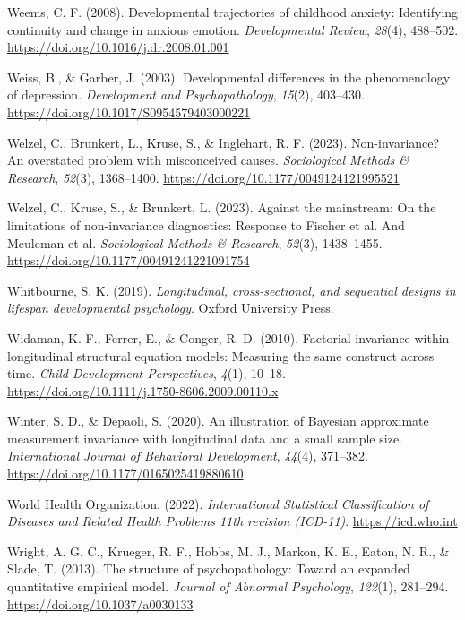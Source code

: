 \documentclass[
  american,
  letterpaper,
  12pt]{article}
\newlength{\cslhangindent}
\newenvironment{CSLReferences}[2] %
 {\begin{list}{}{%
  \setlength{\itemindent}{0pt}
  \setlength{\leftmargin}{0pt}
  \setlength{\parsep}{0pt}
  \ifodd #1
   \setlength{\leftmargin}{\cslhangindent}
   \setlength{\itemindent}{-1\cslhangindent}
  \fi
  \setlength{\itemsep}{#2\baselineskip}}}
 {\end{list}}
\begin{document}
\begin{CSLReferences}{1}{0}
Weems, C. F. (2008). Developmental trajectories of childhood anxiety:
Identifying continuity and change in anxious emotion.
\emph{Developmental Review}, \emph{28}(4), 488--502.
\url{https://doi.org/10.1016/j.dr.2008.01.001}

Weiss, B., \& Garber, J. (2003). Developmental differences in the
phenomenology of depression. \emph{Development and Psychopathology},
\emph{15}(2), 403--430. \url{https://doi.org/10.1017/S0954579403000221}

Welzel, C., Brunkert, L., Kruse, S., \& Inglehart, R. F. (2023).
Non-invariance? {An} overstated problem with misconceived causes.
\emph{Sociological Methods \& Research}, \emph{52}(3), 1368--1400.
\url{https://doi.org/10.1177/0049124121995521}

Welzel, C., Kruse, S., \& Brunkert, L. (2023). Against the mainstream:
{On} the limitations of non-invariance diagnostics: {Response} to
{Fischer} et al. And {Meuleman} et al. \emph{Sociological Methods \&
Research}, \emph{52}(3), 1438--1455.
\url{https://doi.org/10.1177/00491241221091754}

Whitbourne, S. K. (2019). \emph{Longitudinal, cross-sectional, and
sequential designs in lifespan developmental psychology}. Oxford
University Press.

Widaman, K. F., Ferrer, E., \& Conger, R. D. (2010). Factorial
invariance within longitudinal structural equation models: {Measuring}
the same construct across time. \emph{Child Development Perspectives},
\emph{4}(1), 10--18.
\url{https://doi.org/10.1111/j.1750-8606.2009.00110.x}

Winter, S. D., \& Depaoli, S. (2020). An illustration of {Bayesian}
approximate measurement invariance with longitudinal data and a small
sample size. \emph{International Journal of Behavioral Development},
\emph{44}(4), 371--382. \url{https://doi.org/10.1177/0165025419880610}

World Health Organization. (2022). \emph{{International Statistical
Classification of Diseases and Related Health Problems} 11th revision
(ICD-11)}. \url{https://icd.who.int}

Wright, A. G. C., Krueger, R. F., Hobbs, M. J., Markon, K. E., Eaton, N.
R., \& Slade, T. (2013). The structure of psychopathology: {Toward} an
expanded quantitative empirical model. \emph{Journal of Abnormal
Psychology}, \emph{122}(1), 281--294.
\url{https://doi.org/10.1037/a0030133}


\end{CSLReferences}
\end{document}
